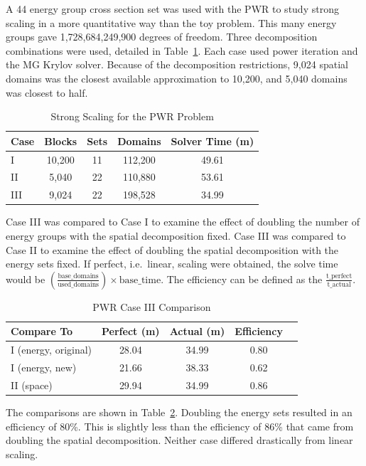 A 44 energy group cross section set was used with the PWR to study strong scaling in a more quantitative way than the toy problem. This many energy groups gave 1,728,684,249,900 degrees of freedom. Three decomposition combinations were used, detailed in Table~\ref{table:StrongCasesPWR}. Each case used power iteration and the MG Krylov solver. Because of the decomposition restrictions, 9,024 spatial domains was the closest available approximation to 10,200, and 5,040 domains was closest to half.
%
\begin{table}[!h]
\caption{Strong Scaling for the PWR Problem}
\begin{center}
\begin{tabular}{l c c c c}
\hline
Case & Blocks & Sets & Domains & Solver Time (m) \\[0.5ex]
\hline
I   & 10,200 & 11 & 112,200 & 49.61 \\
II  & 5,040   & 22 & 110,880 & 53.61 \\
III & 9,024   & 22 & 198,528 & 34.99 \\
\hline
\end{tabular}
\end{center}
\label{table:StrongCasesPWR}
\end{table}

Case III was compared to Case I to examine the effect of doubling the number of energy groups with the spatial decomposition fixed. Case III was compared to Case II to examine the effect of doubling the spatial decomposition with the energy sets fixed. If perfect, i.e.\ linear, scaling were obtained, the solve time would be $(\frac{\text{base\_domains}}{\text{used\_domains}}) \times \text{base\_time}$. The efficiency can be defined as the $\frac{\text{t\_perfect}}{\text{t\_actual}}$. 

\begin{table}[!h]
\caption{PWR Case III Comparison}
\begin{center}
\begin{tabular}{l c c c c}
\hline
Compare To & Perfect (m) & Actual (m) & Efficiency \\[0.5ex]
\hline
I  (energy, original) & 28.04 & 34.99 & 0.80 \\
I  (energy, new)      & 21.66 & 38.33 & 0.62 \\
II  (space)               & 29.94  & 34.99 & 0.86 \\
\hline
\end{tabular}
\end{center}
\label{table:StrongPWRresults}
\end{table}
%
The comparisons are shown in Table~\ref{table:StrongPWRresults}. Doubling the energy sets resulted in an efficiency of 80\%. This is slightly less than the efficiency of 86\% that came from doubling the spatial decomposition. Neither case differed drastically from linear scaling. 

